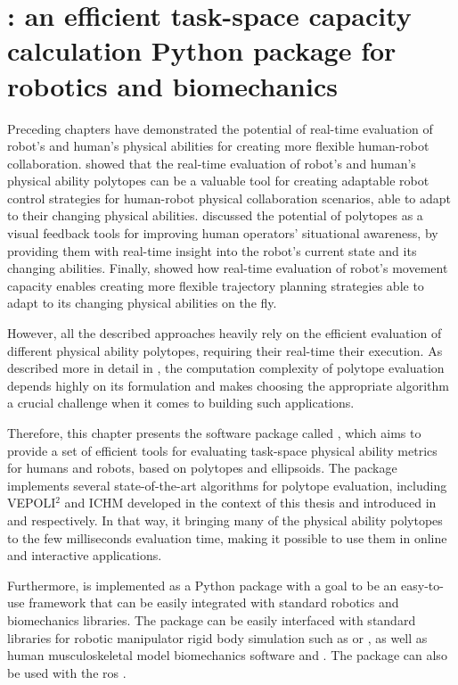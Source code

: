 \chapter{: an efficient task-space capacity calculation Python package for robotics and biomechanics}
\label{ch:software}

Preceding chapters have demonstrated the potential of real-time evaluation of robot's and human's physical abilities for creating more flexible human-robot collaboration.  showed that the real-time evaluation of robot's and human's physical ability polytopes can be a valuable tool for creating adaptable robot control strategies for human-robot physical collaboration scenarios, able to adapt to their changing physical abilities.   discussed the potential of polytopes as a visual feedback tools for improving human operators' situational awareness, by providing them with real-time insight into the robot's current state and its changing abilities. Finally,  showed how real-time evaluation of robot's movement capacity enables creating more flexible trajectory planning strategies able to adapt to its changing physical abilities on the fly. 

However, all the described approaches heavily rely on the efficient evaluation of different physical ability polytopes, requiring their 
real-time their execution. As described more in detail in , the computation complexity of polytope evaluation depends highly on its formulation and makes choosing the appropriate algorithm a crucial challenge when it comes to building such applications. 

Therefore, this chapter presents the software package called , which aims to provide a set of efficient tools for evaluating task-space physical ability metrics for humans and robots, based on polytopes and ellipsoids. The package implements several state-of-the-art algorithms for polytope evaluation, including VEPOLI$^2$ and ICHM developed in the context of this thesis and introduced in  and  respectively. In that way, it bringing many of the physical ability polytopes to the few milliseconds evaluation time, making it possible to use them in online and interactive applications. 

Furthermore,  is implemented as a Python package with a goal to be an easy-to-use framework that can be easily integrated with standard robotics and biomechanics libraries. The package can be easily interfaced with standard libraries for robotic manipulator rigid body simulation such as  \cite{rtb} or  \cite{pinocchio2021}, as well as human musculoskeletal model biomechanics software  \cite{opensim} and  \cite{Michaud2021}. The package can also be used with the \gls{ros} \cite{ros}.

